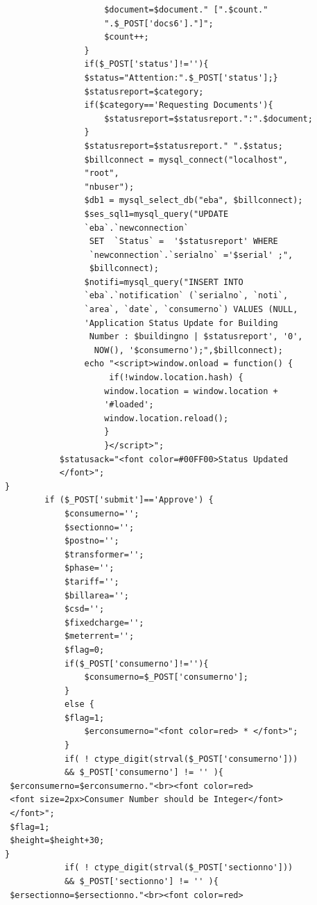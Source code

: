 \documentclass[12pt,a4paper,oneside]{report}
\begin{document}
\begin{lstlisting}
                    $document=$document." [".$count." 
                    ".$_POST['docs6']."]";
                    $count++;
                }
                if($_POST['status']!=''){
                $status="Attention:".$_POST['status'];}
                $statusreport=$category;
                if($category=='Requesting Documents'){
                    $statusreport=$statusreport.":".$document;
                }
                $statusreport=$statusreport." ".$status;
                $billconnect = mysql_connect("localhost", 
                "root", 
                "nbuser");
                $db1 = mysql_select_db("eba", $billconnect);            
                $ses_sql1=mysql_query("UPDATE  
                `eba`.`newconnection`
                 SET  `Status` =  '$statusreport' WHERE  
                 `newconnection`.`serialno` ='$serial' ;", 
                 $billconnect);
                $notifi=mysql_query("INSERT INTO 
                `eba`.`notification` (`serialno`, `noti`, 
                `area`, `date`, `consumerno`) VALUES (NULL, 
                'Application Status Update for Building
                 Number : $buildingno | $statusreport', '0',
                  NOW(), '$consumerno');",$billconnect);           
                echo "<script>window.onload = function() {
                     if(!window.location.hash) {
                    window.location = window.location + 
                    '#loaded';
                    window.location.reload();
                    }
                    }</script>";
           $statusack="<font color=#00FF00>Status Updated
           </font>";
}
        if ($_POST['submit']=='Approve') {
            $consumerno='';
            $sectionno='';
            $postno='';
            $transformer='';
            $phase='';
            $tariff='';
            $billarea='';
            $csd='';
            $fixedcharge='';
            $meterrent='';
            $flag=0;
            if($_POST['consumerno']!=''){               
                $consumerno=$_POST['consumerno'];
            }
            else {
            $flag=1;                
                $erconsumerno="<font color=red> * </font>";
            }
            if( ! ctype_digit(strval($_POST['consumerno'])) 
            && $_POST['consumerno'] != '' ){
 $erconsumerno=$erconsumerno."<br><font color=red>
 <font size=2px>Consumer Number should be Integer</font>
 </font>";
 $flag=1;
 $height=$height+30;
}
            if( ! ctype_digit(strval($_POST['sectionno'])) 
            && $_POST['sectionno'] != '' ){
 $ersectionno=$ersectionno."<br><font color=red>

\end{lstlisting}
\end{document}
